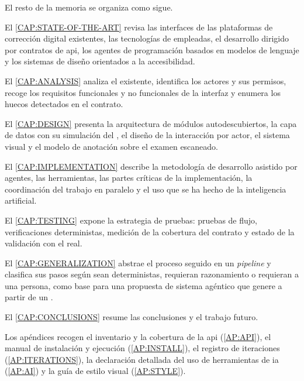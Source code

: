 El resto de la memoria se organiza como sigue.

El \cref{CAP:STATE-OF-THE-ART} revisa las interfaces de las plataformas de corrección
digital existentes, las tecnologías de  empleadas, el desarrollo dirigido por
contratos de \acs{api}, los agentes de programación basados en modelos de lenguaje y los
sistemas de diseño orientados a la accesibilidad.

El \cref{CAP:ANALYSIS} analiza el  existente, identifica los actores y sus
permisos, recoge los requisitos funcionales y no funcionales de la interfaz y enumera los
huecos detectados en el contrato.

El \cref{CAP:DESIGN} presenta la arquitectura de módulos autodescubiertos, la capa de datos
con su simulación del , el diseño de la interacción por actor, el sistema
visual y el modelo de anotación sobre el examen escaneado.

El \cref{CAP:IMPLEMENTATION} describe la metodología de desarrollo asistido por agentes, las
herramientas, las partes críticas de la implementación, la coordinación del trabajo en
paralelo y el uso que se ha hecho de la inteligencia artificial.

El \cref{CAP:TESTING} expone la estrategia de pruebas: pruebas de flujo, verificaciones
deterministas, medición de la cobertura del contrato y estado de la validación con el
 real.

El \cref{CAP:GENERALIZATION} abstrae el proceso seguido en un \textit{pipeline} y clasifica
sus pasos según sean deterministas, requieran razonamiento o requieran a una persona, como
base para una propuesta de sistema agéntico que genere  a partir de un
.

El \cref{CAP:CONCLUSIONS} resume las conclusiones y el trabajo futuro.

Los apéndices recogen el inventario y la cobertura de la \acs{api} (\cref{AP:API}), el
manual de instalación y ejecución (\cref{AP:INSTALL}), el registro de iteraciones
(\cref{AP:ITERATIONS}), la declaración detallada del uso de herramientas de \acs{ia}
(\cref{AP:AI}) y la guía de estilo visual (\cref{AP:STYLE}).
